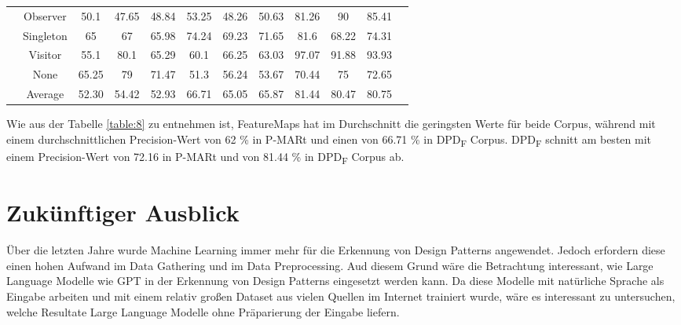 \documentclass[conference]{IEEEtran}
\begin{document}
\begin{table}
\begin{tabular}{|c|c|c|c|c|c|c|c|c|c|c|c|}
                                                     & Observer         & 50.1                              & 47.65                            & 48.84                                      & 53.25  & 48.26  & 50.63     & 81.26  & 90     & 85.41     \\
                                                     & Singleton        & 65                                & 67                               & 65.98                                      & 74.24  & 69.23  & 71.65     & 81.6   & 68.22  & 74.31     \\
                                                     & Visitor          & 55.1                              & 80.1                             & 65.29                                      & 60.1   & 66.25  & 63.03     & 97.07  & 91.88  & 93.93     \\
                                                     & None             & 65.25                             & 79                               & 71.47                                      & 51.3   & 56.24  & 53.67     & 70.44  & 75     & 72.65     \\
        \cline{2-11}
                                                     & Average          & 52.30                             & 54.42                            & 52.93                                      & 66.71  & 65.05  & 65.87     & 81.44  & 80.47  & 80.75     \\
        \hline
    \end{tabular}
\end{table}

\newpage

Wie aus der Tabelle \ref{table:8} zu entnehmen ist, FeatureMaps hat im Durchschnitt die geringsten Werte für beide Corpus, während mit einem durchschnittlichen Precision-Wert von 62 \% in P-MARt und einen von 66.71 \% in DPD\textsubscript{F} Corpus.
DPD\textsubscript{F} schnitt am besten mit einem Precision-Wert von 72.16 in P-MARt und von 81.44 \% in DPD\textsubscript{F} Corpus ab.

\newpage

\section{Zukünftiger Ausblick}

Über die letzten Jahre wurde Machine Learning immer mehr für die Erkennung von Design Patterns angewendet. Jedoch erfordern diese einen hohen Aufwand im Data Gathering und im Data Preprocessing.
Aud diesem Grund wäre die Betrachtung interessant, wie Large Language Modelle wie GPT in der Erkennung von Design Patterns eingesetzt werden kann. Da diese Modelle mit natürliche Sprache als Eingabe arbeiten und mit einem relativ großen Dataset aus vielen Quellen im Internet trainiert wurde,
wäre es interessant zu untersuchen, welche Resultate Large Language Modelle ohne Präparierung der Eingabe liefern.

\newpage


\end{document}
